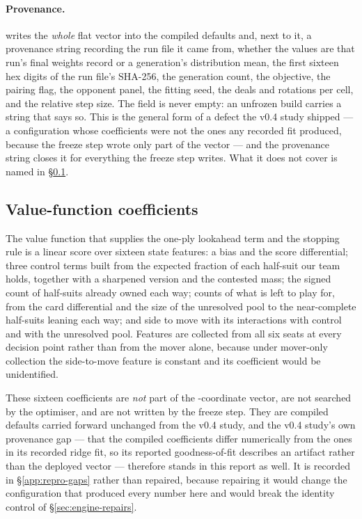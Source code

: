\paragraph{Provenance.}  writes the
\emph{whole} flat vector into the compiled defaults and, next to it, a provenance
string recording the run file it came from, whether the values are that run's
final weights record or a generation's distribution mean, the first sixteen hex
digits of the run file's SHA-256, the generation count, the objective, the
pairing flag, the opponent panel, the fitting seed, the deals and rotations per
cell, and the relative step size. The field is never empty: an unfrozen build
carries a string that says so. This is the general form of a defect the v0.4
study shipped --- a configuration whose coefficients were not the ones any
recorded fit produced, because the freeze step wrote only part of the vector ---
and the provenance string closes it for everything the freeze step writes. What
it does not cover is named in \S\ref{app:params-value}.

\subsection{Value-function coefficients}
\label{app:params-value}

The value function that supplies the one-ply lookahead term and the stopping rule
is a linear score over sixteen state features: a bias and the score differential;
three control terms built from the expected fraction of each half-suit our team
holds, together with a sharpened version and the contested mass; the signed count
of half-suits already owned each way; counts of what is left to play for, from
the card differential and the size of the unresolved pool to the near-complete
half-suits leaning each way; and side to move with its interactions with control
and with the unresolved pool. Features are collected from all six seats at every
decision point rather than from the mover alone, because under mover-only
collection the side-to-move feature is constant and its coefficient would be
unidentified.

These sixteen coefficients are \emph{not} part of the \numVsixParams{}-coordinate
vector, are not searched by the optimiser, and are not written by the freeze
step. They are compiled defaults carried forward unchanged from the v0.4 study,
and the v0.4 study's own provenance gap --- that the compiled coefficients differ
numerically from the ones in its recorded ridge fit, so its reported
goodness-of-fit describes an artifact rather than the deployed vector ---
therefore stands in this report as well. It is recorded in
\S\ref{app:repro-gaps} rather than repaired, because repairing it would change
the configuration that produced every number here and would break the identity
control of \S\ref{sec:engine-repairs}.

